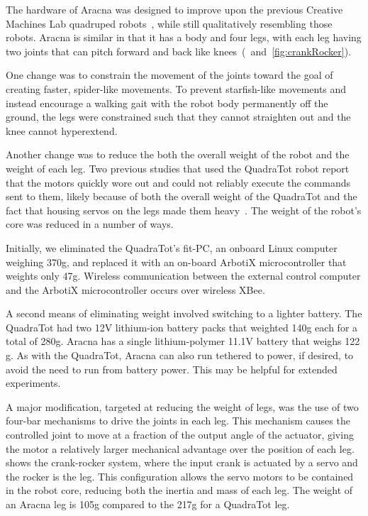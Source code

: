 \documentclass[letterpaper]{article}
\begin{document}
The hardware of Aracna was designed to improve upon the previous Creative Machines Lab
quadruped robots~\citep{bongard2006resilient, yosinski2011gaits}, while still qualitatively resembling those robots. Aracna is similar in that it has a body and four legs, with each leg having two joints that can pitch forward and back like knees~(~and~\ref{fig:crankRocker}). 

One change was to constrain the movement of the
joints toward the goal of creating faster, spider-like movements. To
prevent starfish-like movements and instead encourage a walking gait with the robot body permanently off the ground, the legs were constrained such that they cannot straighten out and the knee cannot hyperextend. 

Another change was to reduce the both the overall weight of the robot and the weight of each leg. Two previous studies that used the QuadraTot robot report that the motors quickly wore out and could not reliably execute the commands sent to them, likely because of both the overall weight of the QuadraTot and the fact that housing servos on the legs made them heavy~\citep{bongard2006resilient, yosinski2011gaits}. The weight of the robot's core was reduced in a number of ways. 

Initially, we eliminated the QuadraTot's fit-PC, an onboard Linux
computer weighing 370g, and replaced it with an on-board ArbotiX
microcontroller that weights only 47g.
Wireless communication between the
external control computer and the ArbotiX microcontroller occurs over
wireless XBee.

A second means of eliminating weight involved switching to a lighter
battery. The QuadraTot had two 12V lithium-ion battery packs that
weighted 140g each for a total of 280g. Aracna has a single
lithium-polymer 11.1V battery that weighs 122 g. As with the
QuadraTot, Aracna can also run tethered to power, if desired, to avoid
the need to run from battery power. This may be helpful for extended
experiments.

A major modification, targeted at reducing the weight of legs, was the use of two four-bar mechanisms to drive the joints in each
leg. This mechanism causes the controlled joint to move at a fraction
of the output angle of the actuator, giving the motor a relatively
larger mechanical advantage over the position of each leg.
 shows the crank-rocker system, where the input crank
is actuated by a servo and the rocker is the leg. This
configuration allows the servo motors to be contained in the robot core, reducing both the inertia and mass of each leg. The weight of an Aracna leg is 105g compared to the 217g for a QuadraTot leg.  
\end{document}
